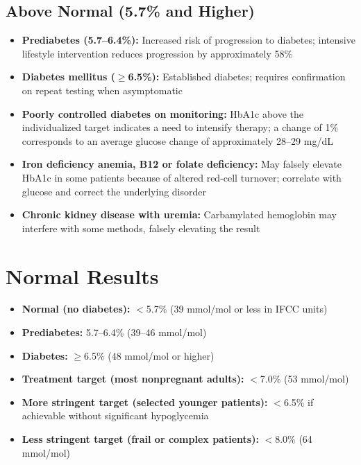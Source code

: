 \subsection*{Above Normal (5.7\% and Higher)}
\begin{itemize}
  \item \textbf{Prediabetes (5.7--6.4\%):} Increased risk of progression to diabetes; intensive lifestyle intervention reduces progression by approximately 58\%
  \item \textbf{Diabetes mellitus ($\geq$6.5\%):} Established diabetes; requires confirmation on repeat testing when asymptomatic
  \item \textbf{Poorly controlled diabetes on monitoring:} HbA1c above the individualized target indicates a need to intensify therapy; a change of 1\% corresponds to an average glucose change of approximately 28--29 mg/dL
  \item \textbf{Iron deficiency anemia, B12 or folate deficiency:} May falsely elevate HbA1c in some patients because of altered red-cell turnover; correlate with glucose and correct the underlying disorder
  \item \textbf{Chronic kidney disease with uremia:} Carbamylated hemoglobin may interfere with some methods, falsely elevating the result
\end{itemize}

\section*{Normal Results}
\begin{itemize}
  \item \textbf{Normal (no diabetes):} $<$5.7\% (39 mmol/mol or less in IFCC units) \cite{fischbach2023manual}
  \item \textbf{Prediabetes:} 5.7--6.4\% (39--46 mmol/mol)
  \item \textbf{Diabetes:} $\geq$6.5\% (48 mmol/mol or higher)
  \item \textbf{Treatment target (most nonpregnant adults):} $<$7.0\% (53 mmol/mol)
  \item \textbf{More stringent target (selected younger patients):} $<$6.5\% if achievable without significant hypoglycemia
  \item \textbf{Less stringent target (frail or complex patients):} $<$8.0\% (64 mmol/mol)
\end{itemize}

